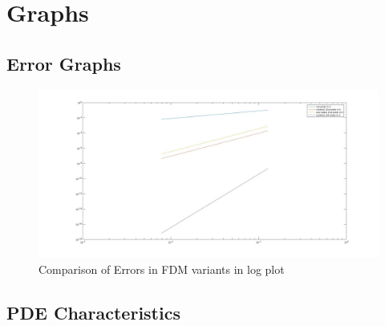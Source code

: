 \chapter{Graphs}
\section{Error Graphs}\label{errorgraph}
\begin{figure}[H]
 \includegraphics[width=\textwidth]{Images/Error.jpg}
 \caption{Comparison of Errors in FDM variants in log plot}
\end{figure}
\section{PDE Characteristics}
